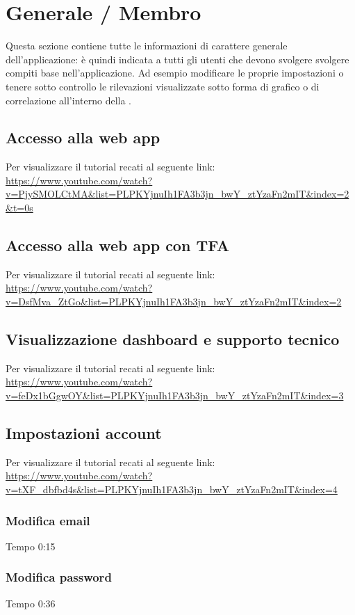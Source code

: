 \section{Generale / Membro}
Questa sezione contiene tutte le informazioni di carattere generale dell'applicazione: è quindi indicata a tutti gli utenti che devono svolgere svolgere compiti base nell'applicazione. Ad esempio modificare le proprie impostazioni o tenere sotto controllo le rilevazioni visualizzate sotto forma di grafico o di correlazione all'interno della .

\subsection{Accesso alla web app}
Per visualizzare il tutorial recati al seguente link: 
\url{https://www.youtube.com/watch?v=PjySMOLCtMA&list=PLPKYjnuIh1FA3b3jn_bwY_ztYzaFn2mIT&index=2&t=0s}

\subsection{Accesso alla web app con TFA}
Per visualizzare il tutorial recati al seguente link: 
\url{https://www.youtube.com/watch?v=DsfMva_ZtGo&list=PLPKYjnuIh1FA3b3jn_bwY_ztYzaFn2mIT&index=2}

\subsection{Visualizzazione dashboard e supporto tecnico}
Per visualizzare il tutorial recati al seguente link: 
\url{https://www.youtube.com/watch?v=feDx1bGgwOY&list=PLPKYjnuIh1FA3b3jn_bwY_ztYzaFn2mIT&index=3}

\subsection{Impostazioni account}
Per visualizzare il tutorial recati al seguente link:
\url{https://www.youtube.com/watch?v=tXF_dbfbd4s&list=PLPKYjnuIh1FA3b3jn_bwY_ztYzaFn2mIT&index=4}

	\subsubsection{Modifica email}
	Tempo 0:15

	\subsubsection{Modifica password}
	Tempo 0:36

